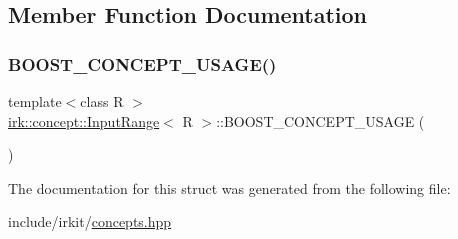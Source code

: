 \subsection{Member Function Documentation}
\mbox{\label{structirk_1_1concept_1_1InputRange_a6330299c4f829cf1bcc9bc1103a660ac}} 
\subsubsection{\texorpdfstring{B\+O\+O\+S\+T\+\_\+\+C\+O\+N\+C\+E\+P\+T\+\_\+\+U\+S\+A\+G\+E()}{BOOST\_CONCEPT\_USAGE()}}
{\footnotesize\ttfamily template$<$class R $>$ \\
\mbox{\hyperlink{structirk_1_1concept_1_1InputRange}{irk\+::concept\+::\+Input\+Range}}$<$ R $>$\+::B\+O\+O\+S\+T\+\_\+\+C\+O\+N\+C\+E\+P\+T\+\_\+\+U\+S\+A\+GE (\begin{DoxyParamCaption}\item[{\mbox{\hyperlink{structirk_1_1concept_1_1InputRange}{Input\+Range}}$<$ R $>$}]{ }\end{DoxyParamCaption})\hspace{0.3cm}{\ttfamily [inline]}}



The documentation for this struct was generated from the following file\+:\begin{DoxyCompactItemize}
\item 
include/irkit/\mbox{\hyperlink{concepts_8hpp}{concepts.\+hpp}}\end{DoxyCompactItemize}
